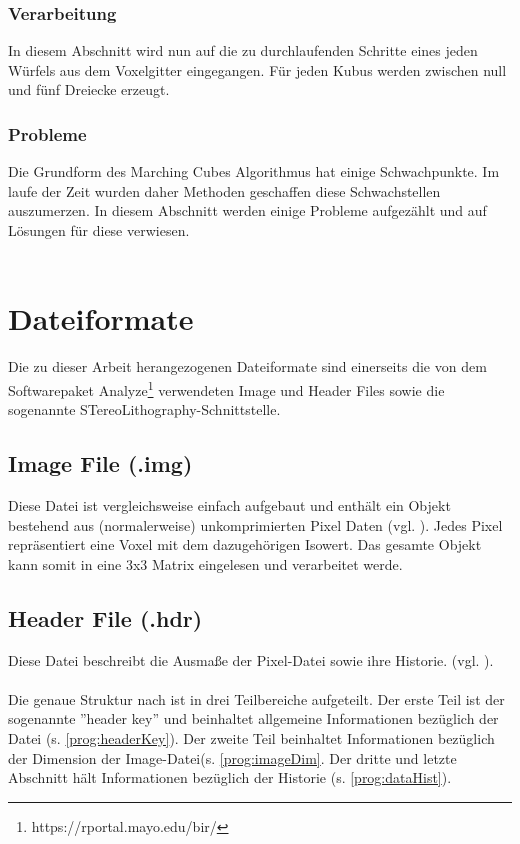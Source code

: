 \subsubsection{Verarbeitung}
In diesem Abschnitt wird nun auf die zu durchlaufenden Schritte eines jeden Würfels aus dem Voxelgitter eingegangen. Für jeden Kubus werden zwischen null und fünf Dreiecke erzeugt.



\subsubsection{Probleme}
Die Grundform des Marching Cubes Algorithmus hat einige Schwachpunkte. Im laufe der Zeit wurden daher Methoden geschaffen diese Schwachstellen auszumerzen. In diesem Abschnitt werden einige Probleme aufgezählt und auf Lösungen für diese verwiesen.\\
\\

\section{Dateiformate}
\label{sec:DateiEinf}
Die zu dieser Arbeit herangezogenen Dateiformate sind einerseits die von dem Softwarepaket Analyze\footnote{https://rportal.mayo.edu/bir/} verwendeten Image und Header Files sowie die sogenannte STereoLithography-Schnittstelle. 

\subsection{Image File (.img)}
Diese Datei ist vergleichsweise einfach aufgebaut und enthält ein Objekt bestehend aus (normalerweise) unkomprimierten Pixel Daten (vgl. \citep{AnalyzeFormat}). Jedes Pixel repräsentiert eine Voxel mit dem dazugehörigen Isowert. Das gesamte Objekt kann somit in eine 3x3 Matrix eingelesen und verarbeitet werde.

\subsection{Header File (.hdr)}
\label{sec:DateiHead}
Diese Datei beschreibt die Ausmaße der Pixel-Datei sowie ihre Historie. (vgl. \citep{AnalyzeFormat}). \\\\
Die genaue Struktur nach \citep{AnalyzeFormat} ist in drei Teilbereiche aufgeteilt. Der erste Teil ist der sogenannte ''header key'' und beinhaltet allgemeine Informationen bezüglich der Datei (s. \ref{prog:headerKey}). Der zweite Teil beinhaltet Informationen bezüglich der Dimension der Image-Datei(s. \ref{prog:imageDim}. Der dritte und letzte Abschnitt hält Informationen bezüglich der Historie (s. \ref{prog:dataHist}).

